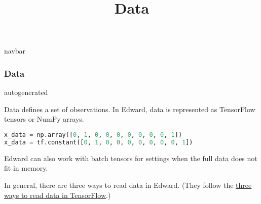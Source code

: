 \title{Data}

{{navbar}}

\subsubsection{Data}

{{autogenerated}}

Data defines a set of observations. In Edward, data is represented as
TensorFlow tensors or NumPy arrays.

\begin{lstlisting}[language=Python]
x_data = np.array([0, 1, 0, 0, 0, 0, 0, 0, 0, 1])
x_data = tf.constant([0, 1, 0, 0, 0, 0, 0, 0, 0, 1])
\end{lstlisting}

Edward can also work with batch tensors for settings when the full
data does not fit in memory.

In general, there are three ways to read data in Edward. (They follow
the \href{https://www.tensorflow.org/versions/master/how_tos/reading_data/index.html}
{three ways to read data in TensorFlow}.)

